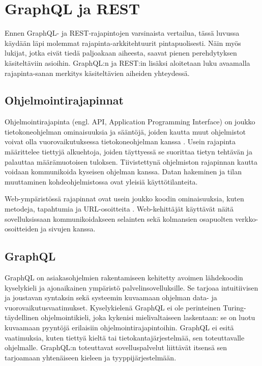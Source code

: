 \chapter{GraphQL ja REST} \label{toinenluku}

Ennen GraphQL- ja REST-rajapintojen varsinaista vertailua, tässä luvussa käydään läpi molemmat rajapinta-arkkitehtuurit pintapuolisesti. Näin myös lukijat, jotka eivät tiedä paljoakaan aiheesta, saavat pienen perehdytyksen käsiteltäviin asioihin. GraphQL:n ja REST:in lisäksi aloitetaan luku avaamalla rajapinta-sanan merkitys käsiteltävien aiheiden yhteydessä.



\setlength{\parindent}{0em}
\setlength{\parskip}{1em}

\section{Ohjelmointirajapinnat}
\label{Ohjelmointirajapinnat}

Ohjelmointirajapinta (engl. API, Application Programming Interface) on joukko tietokoneohjelman ominaisuuksia ja sääntöjä, joiden kautta muut ohjelmistot voivat olla vuorovaikutuksessa tietokoneohjelman kanssa \cite{mdnapi}. Usein rajapinta määrittelee tiettyjä alkuehtoja, joiden täyttyessä se suorittaa tietyn tehtävän ja palauttaa määrämuotoisen tuloksen. Tiivistettynä ohjelmiston rajapinnan kautta voidaan kommunikoida kyseisen ohjelman kanssa. Datan hakeminen ja tilan muuttaminen kohdeohjelmistossa ovat yleisiä käyttötilanteita.

Web-ympäristössä rajapinnat ovat usein joukko koodin ominaisuuksia, kuten metodeja, tapahtumia ja URL-osoitteita \cite{mdnapi}. Web-kehittäjät käyttävät näitä sovelluksissaan kommunikoidakseen selainten sekä kolmansien osapuolten verkko-osoitteiden ja sivujen kanssa.

\section{GraphQL}
\label{GraphQL}

GraphQL on asiakasohjelmien rakentamiseen kehitetty avoimen lähdekoodin kyselykieli ja ajonaikainen ympäristö palvelinsovelluksille. Se tarjoaa intuitiivisen ja joustavan syntaksin sekä systeemin kuvaamaan ohjelman data- ja vuorovaikutusvaatimukset. Kyselykielenä GraphQL ei ole perinteinen Turing-täydellinen ohjelmointikieli, joka
kykenisi mielivaltaiseen laskentaan: se on luotu kuvaamaan pyyntöjä erilaisiin ohjelmointirajapintoihin. GraphQL ei esitä vaatimuksia, kuten tiettyä kieltä tai tietokantajärjestelmää, sen toteuttavalle ohjelmalle. GraphQL:n toteuttavat sovelluspalvelut liittävät itsensä sen tarjoamaan yhtenäiseen kieleen ja tyyppijärjestelmään. \cite{graphql-spec, graphqlorg}

